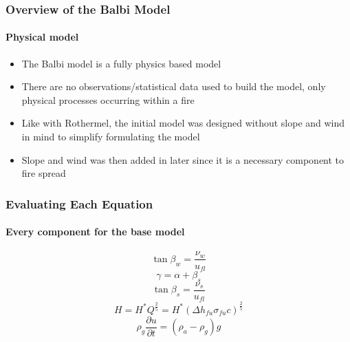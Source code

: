 \documentclass{beamer}
\begin{document}
	
\begin{frame}
	\frametitle{Overview of the Balbi Model}
	\framesubtitle{Physical model}
	
	\begin{itemize}
	\setlength{\itemsep}{7mm}
		\item The Balbi model is a fully physics based model
		\item There are no observations/statistical data used to build the model, only physical processes occurring within a fire
		\item Like with Rothermel, the initial model was designed without slope and wind in mind to simplify formulating the model
		\item Slope and wind was then added in later since it is a necessary component to fire spread
	\end{itemize}
\end{frame}

\begin{frame}
	\frametitle{Evaluating Each Equation}
	\framesubtitle{Every component for the base model}
\begin{equation}
	\tan \beta _ w = \frac {\nu _ w} {u_{fl}} \label{beta_w}
	\end{equation}
\begin{equation}
	\gamma = \alpha + \beta _ s \label{gamma}
	\end{equation}
\begin{equation}
	\tan \beta _ s = \frac {\nu _ s} {u_{fl}} \label{tan_beta}
	\end{equation}
\begin{equation}
	H = H^{*} Q^{\frac {2}{5}} = H^{*}(\Delta h_{fu} \sigma _{fu} c) ^{\frac {2}{5}} \label{Flame height}
	\end{equation}
\begin{equation}
	\label{Vertical momentum Balbi}
	\rho _ g \frac {\partial u} {\partial t} = (\rho _a - \rho _g) g
\end{equation}

\end{frame}
\end{document}
